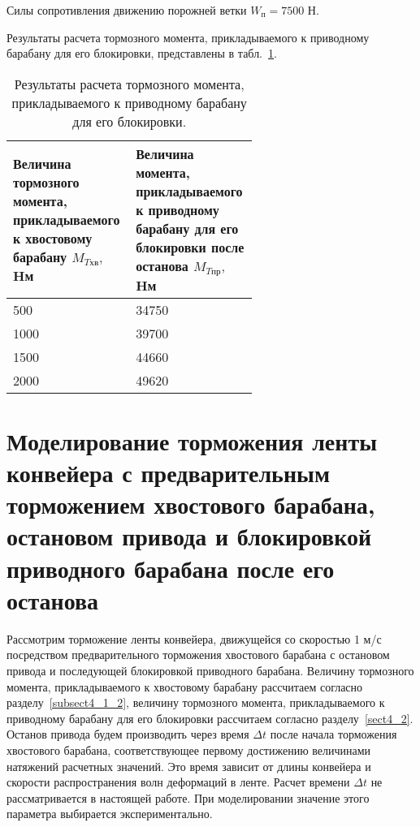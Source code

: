 Силы сопротивления движению порожней ветки  $ W_\text{п} = 7500 $ Н.

Результаты расчета тормозного момента, прикладываемого к приводному барабану для его блокировки, представлены в табл.~\ref{tabl:4.resultMpr}.

\begin{table}[h!]
\caption{Результаты расчета тормозного момента, прикладываемого к приводному барабану для его блокировки.}
\label{tabl:4.resultMpr}
\begin{center}
\begin{tabular}{|p{0.3\linewidth}|p{0.3\linewidth}|}
\hline
Величина тормозного момента, прикладываемого к хвостовому барабану $ M_{T\text{хв}}, $ Hм & Величина момента, прикладываемого к приводному барабану для его блокировки после останова $ M_{T\text{пр}}, $ Hм \\
\hline
500 & 34750 \\
\hline
1000 & 39700 \\
\hline
1500 & 44660 \\
\hline
2000 & 49620 \\
\hline
\end{tabular}
\end{center}
\end{table}
\fi

\section{Моделирование торможения ленты конвейера с предварительным торможением хвостового барабана, остановом привода и блокировкой приводного барабана после его останова} \label{sect4_3}

Рассмотрим торможение ленты конвейера, движущейся со скоростью 1 м/с посредством предварительного торможения хвостового барабана с остановом привода и последующей блокировкой приводного барабана. Величину тормозного момента, прикладываемого к хвостовому барабану рассчитаем согласно разделу~\ref{subsect4_1_2}, величину тормозного момента, прикладываемого к приводному барабану для его блокировки рассчитаем согласно разделу~\ref{sect4_2}. Останов привода будем производить через время $ \Delta t $ после начала торможения хвостового барабана, соответствующее первому достижению величинами натяжений расчетных значений. Это время зависит от длины конвейера и скорости распространения волн деформаций в ленте. Расчет времени $ \Delta t $ не рассматривается в настоящей работе. При моделировании значение этого параметра выбирается экспериментально.\\

